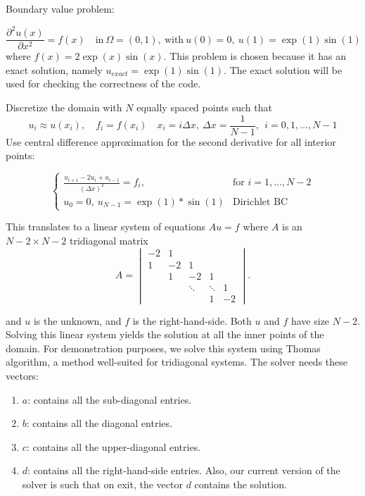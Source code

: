 Boundary value problem:

\begin{equation} 
  \frac{\partial^2 u(x)}{\partial x^2} = f(x) \quad 
  \text{in} \ \Omega=(0,1), \ \text{with} 
  \ u(0)=0, \ u(1)=\exp{(1)}\sin{(1)}
\end{equation} 
where $f(x)=2\exp{(x)}\sin{(x)}$. This problem is chosen because 
it has an exact solution, namely $u_{exact} = \exp{(1)}\sin{(1)}$. 
The exact solution will be used for checking the correctness 
of the code.

Discretize the domain with $N$ equally spaced points such that 
\begin{equation}
u_i \approx u(x_i), \quad f_i=f(x_i) 
\quad x_i = i \Delta x, \ \Delta x=\frac{1}{N-1}, \ \ i=0,1,...,N-1
\end{equation}
Use central difference approximation for the second derivative 
for all interior points:
\begin{large}
\begin{equation}
\begin{cases}
  \frac{u_{i+1} - 2u_i + u_{i-1}}{(\Delta x)^2}=f_i, & \text{for } i=1,...,N-2 \\
    u_0=0, \ u_{N-1}=\exp{(1)}*\sin{(1)} & \text{Dirichlet BC}
\end{cases}  
\end{equation}
\end{large}

This translates to a linear system of equations $Au=f$ 
where $A$ is an $N-2 \times N-2$ tridiagonal matrix 
\begin{equation}
A = \begin{vmatrix}
-2 & 1 \\
1 & -2 & 1 \\
& 1 & -2 & 1 \\
& & \ddots & \ddots & 1 \\
& & & 1 & -2
\end{vmatrix}.
\end{equation}

and $u$ is the unknown, and $f$ is the right-hand-side. 
Both $u$ and $f$ have size $N-2$. 
Solving this linear system yields the solution at all the inner 
points of the domain. For demonstration purposes, we solve 
this system using Thomas algorithm, a method well-suited 
for tridiagonal systems. 
The solver needs these vectors:
\begin{enumerate}
\item $a$: contains all the sub-diagonal entries. 
\item $b$: contains all the diagonal entries. 
\item $c$: contains all the upper-diagonal entries. 
\item $d$: contains all the right-hand-side entries. 
Also, our current version of the solver is 
such that on exit, the vector $d$ contains the solution.
\end{enumerate}

